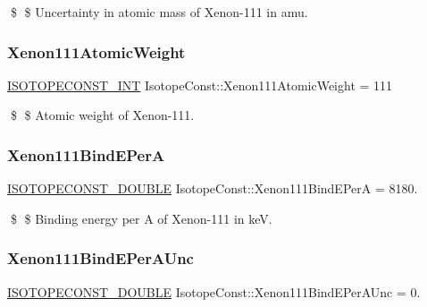 \$ \$ Uncertainty in atomic mass of Xenon-\/111 in amu. \mbox{\label{group___isotope_const-_xenon-_xe111_ga686c9ebb6f45739e5de78e9b5051bd73}} 
\subsubsection{\texorpdfstring{Xenon111\+Atomic\+Weight}{Xenon111AtomicWeight}}
{\footnotesize\ttfamily \mbox{\hyperlink{group___isotope_const-_macros_ga5f18360b3e99483a35c32d789e62621c}{I\+S\+O\+T\+O\+P\+E\+C\+O\+N\+S\+T\+\_\+\+I\+NT}} Isotope\+Const\+::\+Xenon111\+Atomic\+Weight = 111}

\$ \$ Atomic weight of Xenon-\/111. \mbox{\label{group___isotope_const-_xenon-_xe111_ga3d141a6ceb824e2d318841537f1de131}} 
\subsubsection{\texorpdfstring{Xenon111\+Bind\+E\+PerA}{Xenon111BindEPerA}}
{\footnotesize\ttfamily \mbox{\hyperlink{group___isotope_const-_macros_ga8f45a7272ce02c0b4c65c44636ed719a}{I\+S\+O\+T\+O\+P\+E\+C\+O\+N\+S\+T\+\_\+\+D\+O\+U\+B\+LE}} Isotope\+Const\+::\+Xenon111\+Bind\+E\+PerA = 8180.}

\$ \$ Binding energy per A of Xenon-\/111 in keV. \mbox{\label{group___isotope_const-_xenon-_xe111_gac82f59f015f48f297d2760d896985e7f}} 
\subsubsection{\texorpdfstring{Xenon111\+Bind\+E\+Per\+A\+Unc}{Xenon111BindEPerAUnc}}
{\footnotesize\ttfamily \mbox{\hyperlink{group___isotope_const-_macros_ga8f45a7272ce02c0b4c65c44636ed719a}{I\+S\+O\+T\+O\+P\+E\+C\+O\+N\+S\+T\+\_\+\+D\+O\+U\+B\+LE}} Isotope\+Const\+::\+Xenon111\+Bind\+E\+Per\+A\+Unc = 0.}

